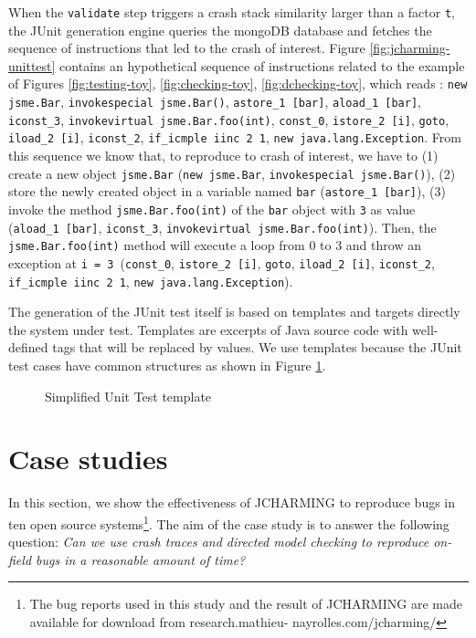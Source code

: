 \documentclass[times]{smrauth}
\begin{document}
When the {\tt validate} step triggers a crash stack similarity larger than a factor {\tt t}, the JUnit generation engine queries the mongoDB database and fetches the sequence of instructions that led to the crash of interest. 
Figure \ref{fig:jcharming-unittest} contains an hypothetical sequence of instructions related to the example of Figures \ref{fig:testing-toy}, \ref{fig:checking-toy}, \ref{fig:dchecking-toy}, which reads : {\tt new jsme.Bar}, {\tt invokespecial jsme.Bar()}, {\tt astore\_1 [bar]}, {\tt aload\_1 [bar]}, {\tt iconst\_3}, {\tt invokevirtual jsme.Bar.foo(int)}, {\tt const\_0}, {\tt istore\_2 [i]}, {\tt goto}, {\tt iload\_2 [i]}, {\tt iconst\_2}, {\tt if\_icmple iinc 2 1}, {\tt new java.lang.Exception}. 
From this sequence we know that, to reproduce to crash of interest, we have to (1) create a new object {\tt jsme.Bar} ({\tt new jsme.Bar}, {\tt invokespecial jsme.Bar()}), (2) store the newly created object in a variable named {\tt bar} ({\tt astore\_1 [bar]}), (3) invoke the method {\tt jsme.Bar.foo(int)} of the {\tt bar} object with {\tt 3} as value ({\tt aload\_1 [bar]}, {\tt iconst\_3}, {\tt invokevirtual jsme.Bar.foo(int)}). Then, the {\tt jsme.Bar.foo(int)} method will execute a loop from 0 to 3 and throw an exception at {\tt i = 3}~({\tt const\_0}, {\tt istore\_2 [i]}, {\tt goto}, {\tt iload\_2 [i]}, {\tt iconst\_2}, {\tt if\_icmple iinc 2 1}, {\tt new java.lang.Exception}).  

The generation of the JUnit test itself is based on templates and targets directly the system under test. Templates are excerpts of Java source code with well-defined tags that will be replaced by values. We use templates because the JUnit test cases have common structures as shown in Figure \ref{fig:jcharming-unittemplate}.

\begin{figure}[h!]

\noindent\fbox{%
    \parbox{\textwidth}{%
    
}%
}

    \caption{Simplified Unit Test template
    \label{fig:jcharming-unittemplate}}
\end{figure}

\section{Case studies\label{sec:cases}}

In this section, we show the effectiveness of JCHARMING to
reproduce bugs in ten open source systems\footnote{The bug reports used in this study and the result of JCHARMING are
made available for download from research.mathieu-
nayrolles.com/jcharming/}. The aim of the
case study is to answer the following question: {\it Can we use
crash traces and directed model checking to reproduce on-
field bugs in a reasonable amount of time?}
\end{document}
